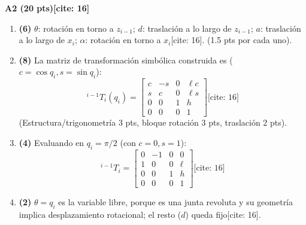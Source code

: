 \documentclass[11pt, a4paper]{article}
\begin{document}
\textbf{A2 (20 pts)[cite: 16]}
\begin{enumerate}\footnotesize
    \item \textbf{(6)} $\theta$: rotación en torno a $z_{i-1}$; $d$: traslación a lo largo de $z_{i-1}$; $a$: traslación a lo largo de $x_i$; $\alpha$: rotación en torno a $x_i$[cite: 16]. (1.5 pts por cada uno).
    \item \textbf{(8)} La matriz de transformación simbólica construida es ($c = \cos q_i, s = \sin q_i$):
    \begin{equation*}
        {}^{i-1}T_i(q_i) = \begin{bmatrix} c & -s & 0 & \ell c \\ s & c & 0 & \ell s \\ 0 & 0 & 1 & h \\ 0 & 0 & 0 & 1 \end{bmatrix} \text{[cite: 16]}
    \end{equation*}
    (Estructura/trigonometría 3 pts, bloque rotación 3 pts, traslación 2 pts).
    \item \textbf{(4)} Evaluando en $q_i = \pi/2$ (con $c=0, s=1$):
    \begin{equation*}
        {}^{i-1}T_i = \begin{bmatrix} 0 & -1 & 0 & 0 \\ 1 & 0 & 0 & \ell \\ 0 & 0 & 1 & h \\ 0 & 0 & 0 & 1 \end{bmatrix} \text{[cite: 16]}
    \end{equation*}
    \item \textbf{(2)} $\theta = q_i$ es la variable libre, porque es una junta revoluta y su geometría implica desplazamiento rotacional; el resto ($d$) queda fijo[cite: 16].
\end{enumerate}
\end{document}
